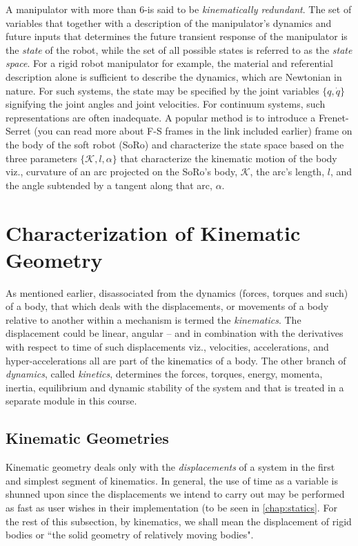  A manipulator with more than 6-\dof is said to be \textit{kinematically redundant}. %
 The set of variables that together with a description of the manipulator's dynamics and future inputs that determines the future transient response of the manipulator is the \textit{state} of the robot, while the set of all possible states is referred to as the \textit{state space}. For a rigid robot manipulator for example, the material and referential description alone is sufficient to describe the dynamics, which are Newtonian in nature. For such systems, the state may be specified by the joint variables $\{q, \dot{q}\}$ signifying the joint angles and joint velocities. For continuum systems, such representations are often inadequate. A popular method is to introduce a Frenet-Serret (you can read more about F-S frames in the link included earlier) frame on the body of the soft robot (SoRo) and characterize the state space based on the three parameters \ie $\{\mathcal{K}, l, \alpha\}$ that characterize the kinematic motion of the body viz., curvature of an arc projected on the SoRo's body, $\mathcal{K}$, the arc's length, $l$, and the angle subtended by a tangent along that arc, $\alpha$.
 
 \section{Characterization of Kinematic Geometry}
 As mentioned earlier, disassociated from the dynamics (\ie forces, torques and such) of a body, that which deals with the displacements, or movements of a body relative to another within a mechanism is termed the \textit{kinematics}. The displacement could be linear, angular -- and in combination with the derivatives with respect to time of such displacements viz., velocities, accelerations, and hyper-accelerations all are part of the kinematics of a body. The other branch of \textit{dynamics}, called \textit{kinetics}, determines the forces, torques, energy, momenta, inertia, equilibrium and dynamic stability of the system and that is treated in a separate module in this course.
 
 \subsection{Kinematic Geometries}
 Kinematic geometry deals only with the \textit{displacements} of a system in the first and simplest segment of kinematics.  In general, the use of time as a variable is shunned upon since the displacements we intend to carry out may be performed as fast as user wishes in their implementation (to be seen in  \autoref{chap:statics}.  For the rest of this subsection, by kinematics, we shall mean the displacement of rigid bodies or ``the solid geometry of relatively moving bodies". 
 
